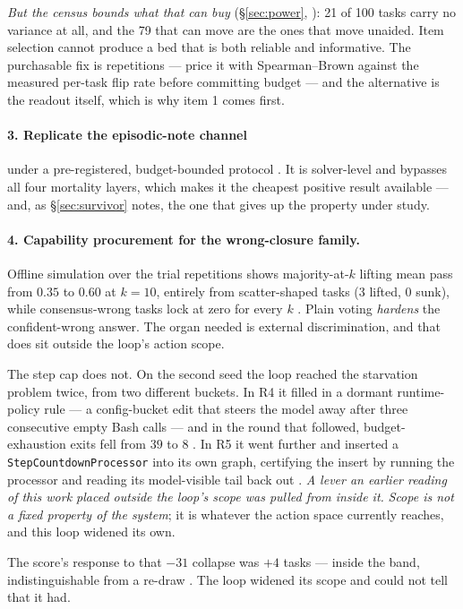 \emph{But the census bounds what that can buy} (\S\ref{sec:power}, ):
21 of 100 tasks carry no variance at all, and the 79 that can move are the
ones that move unaided. Item selection cannot produce a bed that is both
reliable and informative. The purchasable fix is repetitions --- price it
with Spearman--Brown against the measured per-task flip rate before
committing budget --- and the alternative is the readout itself, which is
why item 1 comes first.

\paragraph{3. Replicate the episodic-note channel} under a pre-registered,
budget-bounded protocol . It is solver-level and bypasses all four
mortality layers, which makes it the cheapest positive result available ---
and, as \S\ref{sec:survivor} notes, the one that gives up the property
under study.

\paragraph{4. Capability procurement for the wrong-closure family.}
Offline simulation over the trial repetitions shows majority-at-$k$ lifting
mean pass from $0.35$ to $0.60$ at $k{=}10$, entirely from scatter-shaped
tasks (3 lifted, 0 sunk), while consensus-wrong tasks lock at zero for
every $k$ . Plain voting \emph{hardens} the confident-wrong answer.
The organ needed is external discrimination, and that does sit outside the
loop's action scope.

The step cap does not. On the second seed the loop reached the starvation
problem twice, from two different buckets. In R4 it filled in a dormant
runtime-policy rule --- a config-bucket edit that steers the model away
after three consecutive empty Bash calls --- and in the round that
followed, budget-exhaustion exits fell from $39$ to $8$ . In R5 it
went further and inserted a \texttt{StepCountdownProcessor} into its own
graph, certifying the insert by running the processor and reading its
model-visible tail back out . \emph{A lever an earlier reading of
this work placed outside the loop's scope was pulled from inside it.}
\emph{Scope is not a fixed property of the system}; it is whatever the
action space currently reaches, and this loop widened its own.

The score's response to that $-31$ collapse was $+4$ tasks --- inside the
band, indistinguishable from a re-draw . The loop widened its scope
and could not tell that it had.
